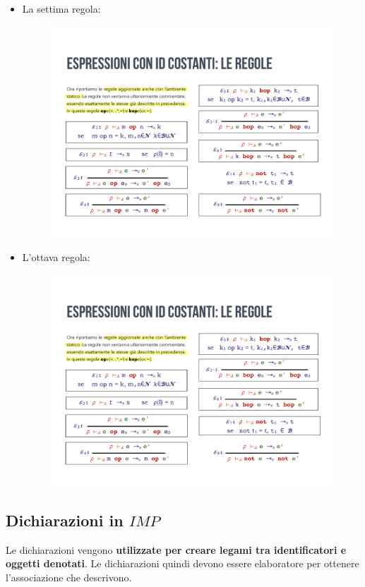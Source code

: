 \documentclass[a4paper]{article}
\begin{document}
\begin{itemize}
		\item La settima regola:
		\begin{figure}[!htp]
			\centering
			\includegraphics[width=.6\textwidth]{img/regola_espressione-mod-7.pdf}
		\end{figure}
		
		\item L'ottava regola:
		\begin{figure}[!htp]
			\centering
			\includegraphics[width=.6\textwidth]{img/regola_espressione-mod-8.pdf}
		\end{figure}
	\end{itemize}\newpage
	
	\subsection{Dichiarazioni in $IMP$}
	
	Le dichiarazioni vengono \textbf{utilizzate per creare legami tra identificatori e oggetti denotati}. Le dichiarazioni quindi devono essere elaboratore per ottenere l'associazione che descrivono.\newline
	
\end{document}
